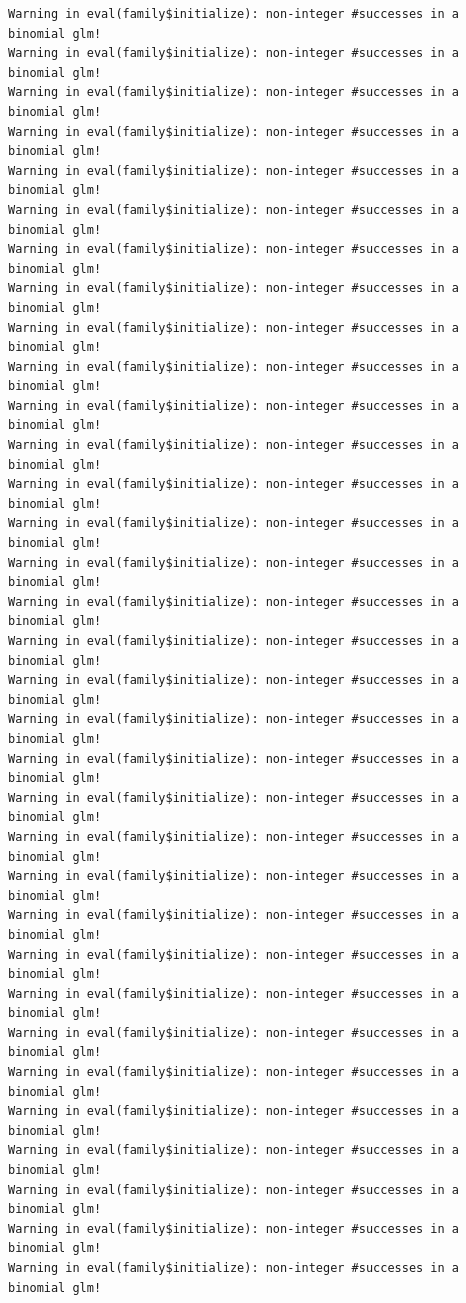 \documentclass[
  letterpaper,
  DIV=11,
  numbers=noendperiod]{scrartcl}
\begin{document}
\begin{verbatim}
Warning in eval(family$initialize): non-integer #successes in a binomial glm!
Warning in eval(family$initialize): non-integer #successes in a binomial glm!
Warning in eval(family$initialize): non-integer #successes in a binomial glm!
Warning in eval(family$initialize): non-integer #successes in a binomial glm!
Warning in eval(family$initialize): non-integer #successes in a binomial glm!
Warning in eval(family$initialize): non-integer #successes in a binomial glm!
Warning in eval(family$initialize): non-integer #successes in a binomial glm!
Warning in eval(family$initialize): non-integer #successes in a binomial glm!
Warning in eval(family$initialize): non-integer #successes in a binomial glm!
Warning in eval(family$initialize): non-integer #successes in a binomial glm!
Warning in eval(family$initialize): non-integer #successes in a binomial glm!
Warning in eval(family$initialize): non-integer #successes in a binomial glm!
Warning in eval(family$initialize): non-integer #successes in a binomial glm!
Warning in eval(family$initialize): non-integer #successes in a binomial glm!
Warning in eval(family$initialize): non-integer #successes in a binomial glm!
Warning in eval(family$initialize): non-integer #successes in a binomial glm!
Warning in eval(family$initialize): non-integer #successes in a binomial glm!
Warning in eval(family$initialize): non-integer #successes in a binomial glm!
Warning in eval(family$initialize): non-integer #successes in a binomial glm!
Warning in eval(family$initialize): non-integer #successes in a binomial glm!
Warning in eval(family$initialize): non-integer #successes in a binomial glm!
Warning in eval(family$initialize): non-integer #successes in a binomial glm!
Warning in eval(family$initialize): non-integer #successes in a binomial glm!
Warning in eval(family$initialize): non-integer #successes in a binomial glm!
Warning in eval(family$initialize): non-integer #successes in a binomial glm!
Warning in eval(family$initialize): non-integer #successes in a binomial glm!
Warning in eval(family$initialize): non-integer #successes in a binomial glm!
Warning in eval(family$initialize): non-integer #successes in a binomial glm!
Warning in eval(family$initialize): non-integer #successes in a binomial glm!
Warning in eval(family$initialize): non-integer #successes in a binomial glm!
Warning in eval(family$initialize): non-integer #successes in a binomial glm!
Warning in eval(family$initialize): non-integer #successes in a binomial glm!
Warning in eval(family$initialize): non-integer #successes in a binomial glm!

\end{verbatim}
\end{document}
